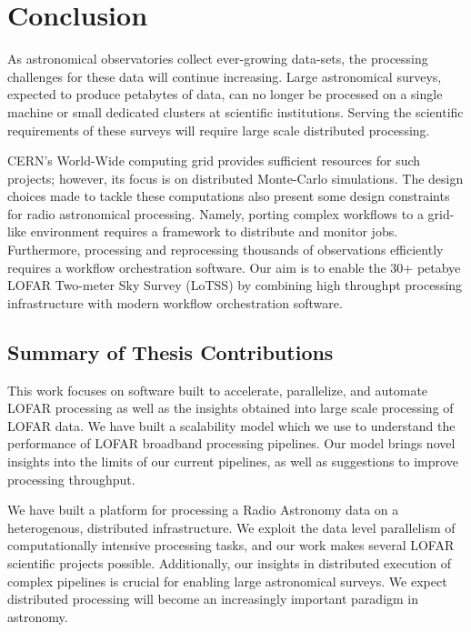 \chapter{Conclusion}

\label{ch:conclusions}

As astronomical observatories collect ever-growing data-sets, the processing challenges for these data will continue increasing. Large astronomical surveys,  expected to produce petabytes of data, can no longer be processed on a single machine or small dedicated clusters at scientific institutions.  Serving the scientific requirements of these surveys will require large scale distributed processing. 

CERN's World-Wide computing grid provides sufficient resources for such projects; however, its focus is on distributed Monte-Carlo simulations. The design choices made to tackle these computations also present some design constraints for radio astronomical processing. Namely, porting complex workflows to a grid-like environment requires a framework to distribute and monitor jobs. Furthermore, processing and reprocessing thousands of observations efficiently requires a workflow orchestration software. Our aim is to enable the 30+ petabye LOFAR Two-meter Sky Survey (LoTSS) by combining high throughpt processing infrastructure with modern workflow orchestration software. 

\section{Summary of Thesis Contributions}

This work focuses on software built to accelerate, parallelize, and automate LOFAR processing as well as the insights obtained into large scale processing of LOFAR data.  We have built a scalability model which  we use to understand the performance of LOFAR broadband processing pipelines. Our model  brings novel insights into the limits of our current pipelines, as well as suggestions to improve processing throughput. 

We have built a platform for processing a Radio Astronomy data on a heterogenous, distributed infrastructure. We exploit the data level parallelism of computationally intensive processing tasks, and our work makes several LOFAR scientific projects possible. Additionally, our insights in distributed  execution of complex pipelines is crucial for enabling large astronomical surveys. We expect distributed processing will become an increasingly important paradigm in astronomy. 

